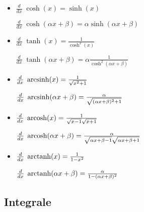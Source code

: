 \begin{itemize}[leftmargin=*]
	\item
	{\small
	\begin{minipage}{0.4\columnwidth}
		$\frac{d}{dx}\; \cosh(x) = \sinh(x)$
	\end{minipage}
	\begin{minipage}{0.55\columnwidth}
		$\frac{d}{dx}\; \cosh(\alpha x + \beta) = \alpha \sinh(\alpha x + \beta)$
	\end{minipage}}
	
	\item 
	{\small
	\begin{minipage}{0.4\columnwidth}
		$\frac{d}{dx}\; \tanh(x) = \frac{1}{\cosh^2(x)}$
	\end{minipage}
	\begin{minipage}{0.55\columnwidth}
		$\frac{d}{dx}\; \tanh(\alpha x + \beta) = \alpha \frac{1}{\cosh^2(\alpha x + \beta)}$
	\end{minipage}}

	\item 
	{\small
	\begin{minipage}{0.4\columnwidth}
		$\frac{d}{dx}\; \operatorname{arcsinh}(x) = \frac{1}{\sqrt{x^2 + 1}}$
	\end{minipage}
	\begin{minipage}{0.55\columnwidth}
		$\frac{d}{dx}\; \operatorname{arcsinh}(\alpha x + \beta) = \frac{\alpha}{\sqrt{(\alpha x + \beta)^2 + 1}}$
	\end{minipage}}
	
	\item
	{\footnotesize
	\begin{minipage}{0.4\columnwidth}
		$\frac{d}{dx}\; \operatorname{arcosh}(x) = \frac{1}{\sqrt{x-1} \sqrt{x + 1}}$
	\end{minipage}
	\begin{minipage}{0.55\columnwidth}
		$\frac{d}{dx}\; \operatorname{arcosh}(\alpha x + \beta) = \frac{\alpha}{\sqrt{\alpha x + \beta - 1} \sqrt{\alpha x + \beta + 1}}$
	\end{minipage}}

	\item 
	{\small
	\begin{minipage}{0.4\columnwidth}
		$\frac{d}{dx}\; \operatorname{arctanh}(x) = \frac{1}{1-x^2}$
	\end{minipage}
	\begin{minipage}{0.55\columnwidth}
		$\frac{d}{dx}\; \operatorname{arctanh}(\alpha x + \beta) = \frac{\alpha}{1 - (\alpha x + \beta)^2}$
	\end{minipage}}
\end{itemize}

\subsection{Integrale}
